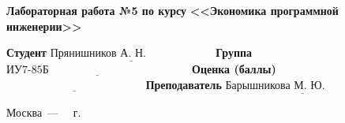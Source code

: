 \begin{titlepage}
	\begin{center}
		\Large\textbf{Лабораторная работа №5 по курсу}
		\Large\textbf{\hspace*{38pt}<<Экономика программной инженерии>>}\newline\newline\newline
	\end{center}
	
	\noindent\textbf{Студент} $\underline{\text{Прянишников А. Н.~~~~~~~~~~~~~~~~~~}}$\newline\newline
	\noindent\textbf{Группа} $\underline{\text{ИУ7-85Б~~~~~~~~~~~~~~~~~~~~~~~~~~~~~~~~~~~~~~}}$\newline\newline
	\noindent\textbf{Оценка (баллы)} $\underline{\text{~~~~~~~~~~~~~~~~~~~~~~~~~~~~~~~~~~~~~}}$\newline\newline
	\noindent\textbf{Преподаватель} $\underline{\text{Барышникова~М.~Ю.~~~~~~~~~~~~~~~}}$\newline
	
	\begin{center}
		\vfill
		Москва~---~\the\year
		~г.
	\end{center}
	\restoregeometry
\end{titlepage}